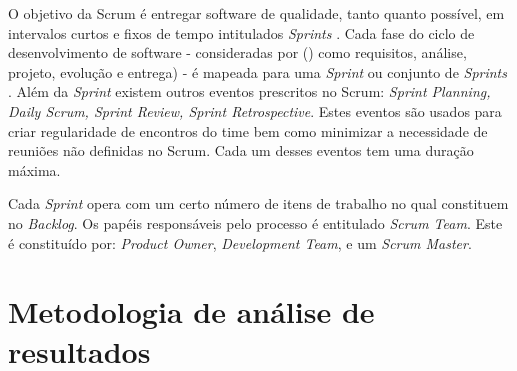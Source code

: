 O objetivo da Scrum é entregar software de qualidade, tanto quanto possível, em intervalos curtos e fixos de tempo intitulados \textit{Sprints} \cite{beedle1999}. Cada fase do ciclo de desenvolvimento de software - consideradas por \citeauthor{beedle1999} (\citeyear{beedle1999}) como requisitos, análise, projeto, evolução e entrega) - é mapeada para uma \textit{Sprint} ou conjunto de \textit{Sprints} \cite{beedle1999}. Além da \textit{Sprint} existem outros eventos prescritos no Scrum: \textit{Sprint Planning, Daily Scrum, Sprint Review, Sprint Retrospective}. Estes eventos são usados para criar regularidade de encontros do time bem como minimizar a necessidade de reuniões não definidas no Scrum. Cada um desses eventos tem uma duração máxima.



Cada \textit{Sprint} opera com um certo número de itens de trabalho no qual constituem no \textit{Backlog}. Os papéis responsáveis pelo processo é entitulado \textit{Scrum Team}. Este é constituído por: \textit{Product Owner}, \textit{Development Team}, e um \textit{Scrum Master}.


\section{Metodologia de análise de resultados}








